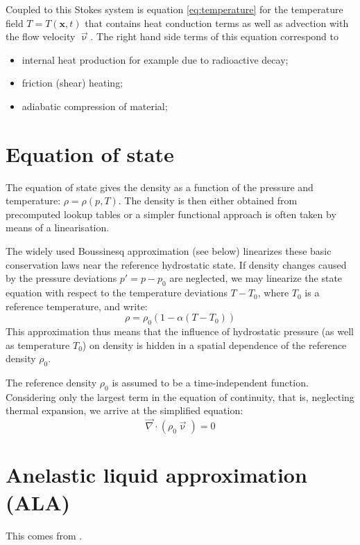 \documentclass[a4paper]{article}
\begin{document}
Coupled to this Stokes system is equation \eqref{eq:temperature} for the
temperature field $T=T(\mathbf x,t)$ that contains heat conduction terms as
well as advection with the flow velocity $\vec{\upnu}$. The right hand side
terms of this equation correspond to
\begin{itemize}
\item internal heat production for example due to radioactive decay;
\item friction (shear) heating;
\item adiabatic compression of material;
\end{itemize}


\newpage
\section{Equation of state}

The equation of state gives the density as a function of the
pressure and temperature: $\rho=\rho(p,T)$.
The density is then either obtained from precomputed lookup
tables or a simpler functional approach is often taken
by means of a linearisation.

The widely used Boussinesq approximation (see below) linearizes these
basic conservation laws near the reference hydrostatic state.
If density changes caused by the pressure deviations
$p' = p-p_0$ are neglected, we may linearize the state equation with respect to
the temperature deviations $T-T_0$, where $T_0$ is a reference
temperature, and write:
\[
\rho=\rho_0(1-\alpha(T-T_0))
\]
This approximation thus means that the inﬂuence of hydrostatic pressure 
(as well as temperature $T_0$) on density is hidden
in a spatial dependence of the reference density $\rho_0$.

The reference density $\rho_0$ is assumed to be a time-independent function. 
Considering only the largest term in the equation of continuity, that is, 
neglecting thermal expansion, we arrive at the simpliﬁed equation:
\[
\vec\nabla\cdot(\rho_0 \vec\upnu) =0
\]


\newpage
\section{Anelastic liquid approximation (ALA)}

This comes from \textcite{mayu07}.
\end{document}
